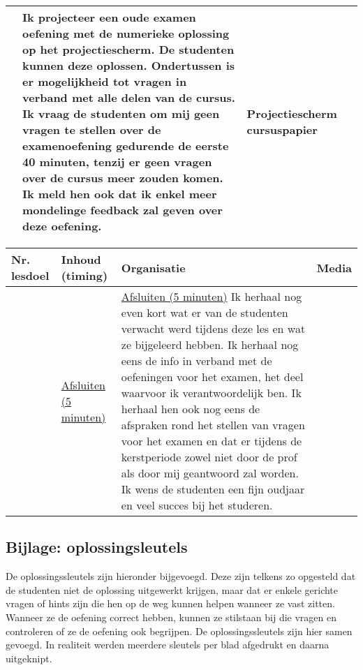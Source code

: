 \begin{landscape}
\begin{tabularx}{1.56\textwidth}{|p{1.5cm}|p{6cm}|X|p{4cm}|}
	&  Ik projecteer een oude examen oefening met de numerieke oplossing op het projectiescherm. De studenten kunnen deze oplossen. Ondertussen is er mogelijkheid tot vragen in verband met alle delen van de cursus. Ik vraag de studenten om mij geen vragen te stellen over de examenoefening gedurende de eerste 40 minuten, tenzij er geen vragen over de cursus meer zouden komen. Ik meld hen ook dat ik enkel meer mondelinge feedback zal geven over deze oefening. 
	& Projectiescherm \newline cursuspapier 
	\\ \hline
\end{tabularx}


	
\begin{tabularx}{1.56\textwidth}{|p{1.5cm}|p{6cm}|X|p{4cm}|}
	\hline
	\textbf{Nr. lesdoel } & \textbf{Inhoud (timing)}  & \textbf{Organisatie } & \textbf{Media } \\ \hline
	&\underline{Afsluiten (5 minuten)}\newline 
	&  \underline{Afsluiten (5 minuten)}\newline
	Ik herhaal nog even kort wat er van de studenten verwacht werd tijdens deze les en wat ze bijgeleerd hebben. Ik herhaal nog eens de info in verband met de oefeningen voor het examen, het deel waarvoor ik verantwoordelijk ben. Ik herhaal hen ook nog eens de afspraken rond het stellen van vragen voor het examen en dat er tijdens de kerstperiode zowel niet door de prof als door mij geantwoord zal worden.  Ik wens de studenten een fijn oudjaar en veel succes bij het studeren.
	& 
	\\ \hline
\end{tabularx}
	
	
	
	
	
	
	
\end{landscape}

\subsection*{Bijlage: oplossingsleutels}
De oplossingssleutels zijn hieronder bijgevoegd. Deze zijn telkens zo opgesteld dat de studenten niet de oplossing uitgewerkt krijgen, maar dat er enkele gerichte vragen of hints zijn die hen op de weg kunnen helpen wanneer ze vast zitten. Wanneer ze de oefening correct hebben, kunnen ze stilstaan bij die vragen en controleren of ze de oefening ook begrijpen.\newline
De oplossingssleutels zijn hier samen gevoegd. In realiteit werden meerdere sleutels per blad afgedrukt en daarna uitgeknipt.

